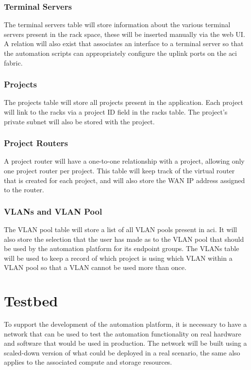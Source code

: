 \subsubsection{Terminal Servers}
\label{design:web-application:database:terminal-servers}
The terminal servers table will store information about the various terminal servers present in the rack space, these will be inserted manually via the web UI. A relation will also exist that associates an interface to a terminal server so that the automation scripts can appropriately configure the uplink ports on the \gls{aci} fabric.

\subsubsection{Projects}
\label{design:web-application:database:projects}
The projects table will store all projects present in the application. Each project will link to the racks via a project ID field in the racks table. The project's private subnet will also be stored with the project.

\subsubsection{Project Routers}
\label{design:web-application:database:project-routers}
A project router will have a one-to-one relationship with a project, allowing only one project router per project. This table will keep track of the virtual router that is created for each project, and will also store the WAN IP address assigned to the router.

\subsubsection{VLANs and VLAN Pool}
\label{design:web-application:database:vlan-and-vlan-pool}
The VLAN pool table will store a list of all VLAN pools present in \gls{aci}. It will also store the selection that the user has made as to the VLAN pool that should be used by the automation platform for its endpoint groups. The VLANs table will be used to keep a record of which project is using which VLAN within a VLAN pool so that a VLAN cannot be used more than once.

\section{Testbed}
\label{design:Testbed}
To support the development of the automation platform, it is necessary to have a network that can be used to test the automation functionality on real hardware and software that would be used in production. The network will be built using a scaled-down version of what could be deployed in a real scenario, the same also applies to the associated compute and storage resources.


